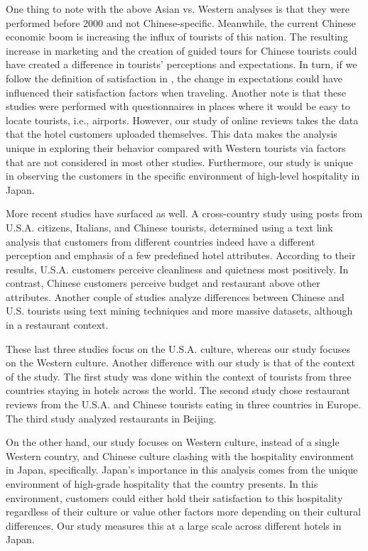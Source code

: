 \documentclass[smallextended,natbib]{svjour3}       %
\begin{document}
    One thing to note with the above Asian vs. Western analyses is that they were performed before 2000 and not Chinese-specific. Meanwhile, the current Chinese economic boom is increasing the influx of tourists of this nation. The resulting increase in marketing and the creation of guided tours for Chinese tourists could have created a difference in tourists' perceptions and expectations. In turn, if we follow the definition of satisfaction in \cite{hunt1975}, the change in expectations could have influenced their satisfaction factors when traveling. Another note is that these studies were performed with questionnaires in places where it would be easy to locate tourists, i.e., airports. However, our study of online reviews takes the data that the hotel customers uploaded themselves. This data makes the analysis unique in exploring their behavior compared with Western tourists via factors that are not considered in most other studies. Furthermore, our study is unique in observing the customers in the specific environment of high-level hospitality in Japan.

    More recent studies have surfaced as well. A cross-country study \cite[][]{FRANCESCO201924} using posts from U.S.A. citizens, Italians, and Chinese tourists, determined using a text link analysis that customers from different countries indeed have a different perception and emphasis of a few predefined hotel attributes. According to their results, U.S.A. customers perceive cleanliness and quietness most positively. In contrast, Chinese customers perceive budget and restaurant above other attributes. Another couple of studies \cite[][]{JIA2020104071, HUANG2017117} analyze differences between Chinese and U.S. tourists using text mining techniques and more massive datasets, although in a restaurant context. 

    These last three studies focus on the U.S.A. culture, whereas our study focuses on the Western culture. Another difference with our study is that of the context of the study. The first study \cite[][]{FRANCESCO201924} was done within the context of tourists from three countries staying in hotels across the world. The second study chose restaurant reviews from the U.S.A. and Chinese tourists eating in three countries in Europe. The third study analyzed restaurants in Beijing.

    On the other hand, our study focuses on Western culture, instead of a single Western country, and Chinese culture clashing with the hospitality environment in Japan, specifically. Japan's importance in this analysis comes from the unique environment of high-grade hospitality that the country presents. In this environment, customers could either hold their satisfaction to this hospitality regardless of their culture or value other factors more depending on their cultural differences. Our study measures this at a large scale across different hotels in Japan.
\end{document}
